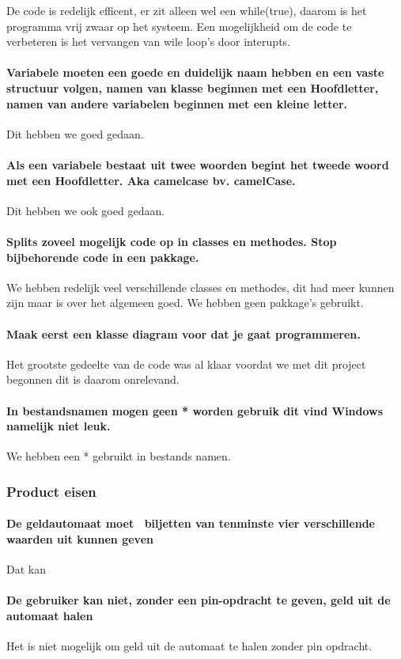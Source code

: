 \documentclass{article}
\begin{document}
De code is redelijk efficent, er zit alleen wel een while(true), daarom is het programma vrij zwaar op het systeem. Een mogelijkheid om de code te verbeteren is het vervangen van wile loop's door interupts.
\paragraph{Variabele moeten een goede en duidelijk naam hebben en een vaste structuur volgen, namen van klasse beginnen met een Hoofdletter, namen van andere variabelen beginnen met een kleine letter.}
Dit hebben we goed gedaan.
	\paragraph{Als een variabele bestaat uit twee woorden begint het tweede woord met een Hoofdletter. Aka camelcase bv. camelCase.}
Dit hebben we ook goed gedaan.
	\paragraph{Splits zoveel mogelijk code op in classes en methodes. Stop bijbehorende code in een pakkage.}
We hebben redelijk veel verschillende classes en methodes, dit had meer kunnen zijn maar is over het algemeen goed. We hebben geen pakkage's gebruikt.
	\paragraph{Maak eerst een klasse diagram voor dat je gaat programmeren.}
Het grootste gedeelte van de code was al klaar voordat we met dit project begonnen dit is daarom onrelevand.
	\paragraph{In bestandsnamen mogen geen * worden gebruik dit vind Windows namelijk niet leuk.}
We hebben een * gebruikt in bestands namen.
\subsubsection{Product eisen}

	\paragraph{De geldautomaat moet  biljetten van tenminste vier verschillende waarden uit kunnen geven}
Dat kan
	\paragraph{De gebruiker kan niet, zonder een pin-opdracht te geven, geld uit de automaat halen}
Het is niet mogelijk om geld uit de automaat te halen zonder pin opdracht.
\end{document}
